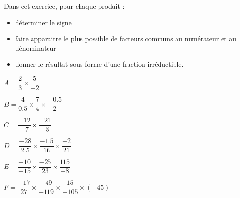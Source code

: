 \begin{exercice*}
    Dans cet exercice, pour chaque produit :
    \begin{itemize}
        \item déterminer le signe
        \item faire apparaitre le plus possible de facteurs communs au numérateur et au dénominateur
        \item donner le résultat sous forme d'une fraction irréductible.
    \end{itemize}
    \vspace*{-9mm}
    \begin{spacing}{2}
        \begin{list}{}{}
            \item $A=\dfrac{2}{3}\times \dfrac{5}{-2}$
            \item $B=\dfrac{4}{\num{0.5}}\times\dfrac{7}{4}\times\dfrac{\num{-0.5}}{2}$
            \item $C=\dfrac{-12}{-7}\times\dfrac{-21}{-8}$
            \item $D=\dfrac{-28}{\num{2.5}}\times\dfrac{\num{-1.5}}{16}\times\dfrac{-2}{21}$
            \item $E=\dfrac{-10}{-15}\times\dfrac{-25}{23}\times\dfrac{115}{-8}$                
            \item $F=\dfrac{-17}{27}\times\dfrac{-49}{-119}\times\dfrac{15}{-105}\times(-45)$
        \end{list}
    \end{spacing}
    \vspace*{-5mm}
\end{exercice*}
